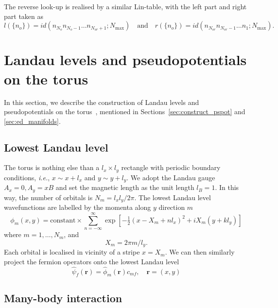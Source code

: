 \documentclass{timesjhep}
\begin{document}
The reverse look-up is realised by a similar Lin-table, with the left part and right part taken as
\begin{equation}
    l(\{n_o\})=id(n_{N_o}n_{N_o-1}\dots n_{N_{or}+1};N_{\max})\quad\textrm{and}\quad r(\{n_o\})=id(n_{N_{or}}n_{N_{or}-1}\dots n_{1};N_{\max}).
\end{equation} 

\FloatBarrier

\section{Landau levels and pseudopotentials on the torus}
\label{app:manifolds}

In this section, we describe the construction of Landau levels and pseudopotentials on the torus~\cite{Yoshioka1983Torus,Haldane1985Torus,Haldane1987Torus}, mentioned in Sections~\ref{sec:construct_pspot} and \ref{sec:ed_manifolds}.

\subsection{Lowest Landau level}

The torus is nothing else than a $l_x\times l_y$ rectangle with periodic boundary conditions, \textit{i.e.}, $x\sim x+l_x$ and $y\sim y+l_y$. We adopt the Landau gauge $A_x=0,A_y=xB$ and set the magnetic length as the unit length $l_B=1$. In this way, the number of orbitals is $N_m=l_xl_y/2\pi$. The lowest Landau level wavefunctions are labelled by the momenta along $y$ direction $m$
\begin{equation}
    \phi_m(x,y)=\textrm{constant}\times\sum_{n=-\infty}^\infty\exp\left[-\tfrac{1}{2}(x-X_m+nl_x)^2+iX_m(y+kl_y)\right]
\end{equation}
where $m=1,\dots,N_m$, and
\begin{equation*}
    X_m=2\pi m/l_y.
\end{equation*}
Each orbital is localised in vicinity of a stripe $x=X_m$. We can then similarly project the fermion operators onto the lowest Landau level 
\begin{equation}
    \hat{\psi}_{f}(\mathbf{r})=\hat{\phi}_m(\mathbf{r})\hat{c}_{mf},\quad\mathbf{r}=(x,y)
\end{equation}

\subsection{Many-body interaction}
\end{document}
